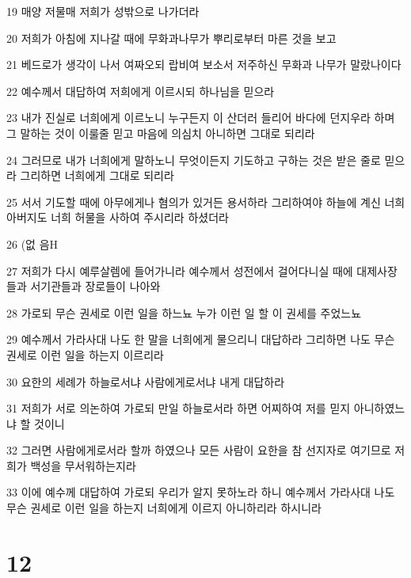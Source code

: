 \par 19 매양 저물매 저희가 성밖으로 나가더라
\par 20 저희가 아침에 지나갈 때에 무화과나무가 뿌리로부터 마른 것을 보고
\par 21 베드로가 생각이 나서 여짜오되 랍비여 보소서 저주하신 무화과 나무가 말랐나이다
\par 22 예수께서 대답하여 저희에게 이르시되 하나님을 믿으라
\par 23 내가 진실로 너희에게 이르노니 누구든지 이 산더러 들리어 바다에 던지우라 하며 그 말하는 것이 이룰줄 믿고 마음에 의심치 아니하면 그대로 되리라
\par 24 그러므로 내가 너희에게 말하노니 무엇이든지 기도하고 구하는 것은 받은 줄로 믿으라 그리하면 너희에게 그대로 되리라
\par 25 서서 기도할 때에 아무에게나 혐의가 있거든 용서하라 그리하여야 하늘에 계신 너희 아버지도 너희 허물을 사하여 주시리라 하셨더라
\par 26 (없 음H
\par 27 저희가 다시 예루살렘에 들어가니라 예수께서 성전에서 걸어다니실 때에 대제사장들과 서기관들과 장로들이 나아와
\par 28 가로되 무슨 권세로 이런 일을 하느뇨 누가 이런 일 할 이 권세를 주었느뇨
\par 29 예수께서 가라사대 나도 한 말을 너희에게 물으리니 대답하라 그리하면 나도 무슨 권세로 이런 일을 하는지 이르리라
\par 30 요한의 세례가 하늘로서냐 사람에게로서냐 내게 대답하라
\par 31 저희가 서로 의논하여 가로되 만일 하늘로서라 하면 어찌하여 저를 믿지 아니하였느냐 할 것이니
\par 32 그러면 사람에게로서라 할까 하였으나 모든 사람이 요한을 참 선지자로 여기므로 저희가 백성을 무서워하는지라
\par 33 이에 예수께 대답하여 가로되 우리가 알지 못하노라 하니 예수께서 가라사대 나도 무슨 권세로 이런 일을 하는지 너희에게 이르지 아니하리라 하시니라

\chapter{12}

